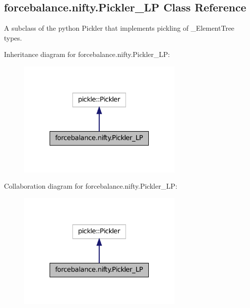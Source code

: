 \hypertarget{classforcebalance_1_1nifty_1_1Pickler__LP}{\subsection{forcebalance.\-nifty.\-Pickler\-\_\-\-L\-P Class Reference}
\label{classforcebalance_1_1nifty_1_1Pickler__LP}
}


A subclass of the python Pickler that implements pickling of \-\_\-\-Element\-Tree types.  




Inheritance diagram for forcebalance.\-nifty.\-Pickler\-\_\-\-L\-P\-:\nopagebreak
\begin{figure}[H]
\begin{center}
\leavevmode
\includegraphics[width=228pt]{classforcebalance_1_1nifty_1_1Pickler__LP__inherit__graph}
\end{center}
\end{figure}


Collaboration diagram for forcebalance.\-nifty.\-Pickler\-\_\-\-L\-P\-:\nopagebreak
\begin{figure}[H]
\begin{center}
\leavevmode
\includegraphics[width=228pt]{classforcebalance_1_1nifty_1_1Pickler__LP__coll__graph}
\end{center}
\end{figure}
